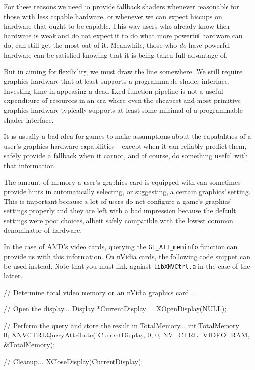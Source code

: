 For these reasons we need to provide fallback shaders whenever reasonable for those with less capable hardware, or whenever we can expect hiccups on hardware that ought to be capable. This way users who already know their hardware is weak and do not expect it to do what more powerful hardware can do, can still get the most out of it. Meanwhile, those who {\it do} have powerful hardware can be satisfied knowing that it is being taken full advantage of.

But in aiming for flexibility, we must draw the line somewhere. We still require graphics hardware that at least supports a programmable shader interface. Investing time in appeasing a dead fixed function pipeline is not a useful expenditure of resources in an era where even the cheapest and most primitive graphics hardware typically supports at least some minimal of a programmable shader interface.

It is usually a bad idea for games to make assumptions about the capabilities of a user's graphics hardware capabilities -- except when it can reliably predict them, safely provide a fallback when it cannot, and of course, do something useful with that information. 

The amount of memory a user's graphics card is equipped with can sometimes provide hints in automatically selecting, or suggesting, a certain graphics' setting. This is important because a lot of users do not configure a game's graphics' settings properly and they are left with a bad impression because the default settings were poor choices, albeit safely compatible with the lowest common denominator of hardware.

In the case of AMD's video cards, querying the {\tt GL_ATI_meminfo} function can provide us with this information. On nVidia cards, the following code snippet can be used instead. Note that you must link against {\tt libXNVCtrl.a} in the case of the latter.

\startCodeExample
// Determine total video memory on an nVidia graphics card...

    // Open the display...
    Display *CurrentDisplay = XOpenDisplay(NULL);

    // Perform the query and store the result in TotalMemory...
    int TotalMemory = 0;
    XNVCTRLQueryAttribute(
        CurrentDisplay, 0, 0, NV_CTRL_VIDEO_RAM, &TotalMemory);
    
    // Cleanup...
    XCloseDisplay(CurrentDisplay);
\stopCodeExample

